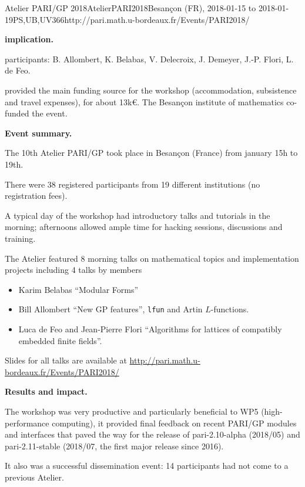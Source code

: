 \begin{event}{Atelier PARI/GP 2018}{AtelierPARI2018}{Besan\c{c}on (FR),
2018-01-15 to 2018-01-19}{PS,UB,UV}{36}{6}{http://pari.math.u-bordeaux.fr/Events/PARI2018/}


\textbf{\ODK implication.}

\ODK participants: B. Allombert, K. Belabas, V. Delecroix, J. Demeyer,
J.-P. Flori, L. de Feo.

\ODK provided the main funding source for the workshop (accommodation,
subsistence and travel expenses), for about 13k\euro. The Besan\c{c}on
institute of mathematics co-funded the event.

\textbf{Event summary.}

The 10th Atelier PARI/GP took place in Besan\c{c}on (France) from january
15h to 19th.

There were 38 registered participants from 19 different institutions
(no registration fees).

A typical day of the workshop had introductory talks and tutorials
in the morning; afternoons allowed ample time for hacking sessions,
discussions and training.

The Atelier featured 8 morning talks on mathematical topics and
implementation projects including 4 talks by \ODK members
\begin{itemize}
\item Karim Belabas ``Modular Forms''
\item Bill Allombert ``New GP features'', \texttt{lfun} and Artin
  $L$-functions.
\item Luca de Feo and Jean-Pierre Flori ``Algorithms for lattices of
  compatibly embedded finite fields''.
\end{itemize}

Slides for all talks are available at
\url{http://pari.math.u-bordeaux.fr/Events/PARI2018/}

\textbf{Results and impact.}

The workshop was very productive and particularly beneficial to WP5
(high-performance computing), it provided final feedback on recent PARI/GP
  modules and interfaces that paved the way for the release of
  pari-2.10-alpha (2018/05) and pari-2.11-stable (2018/07, the first major
  release since 2016).

It also was a successful dissemination event: 14 participants had not come to
  a previous Atelier.
\end{event}
